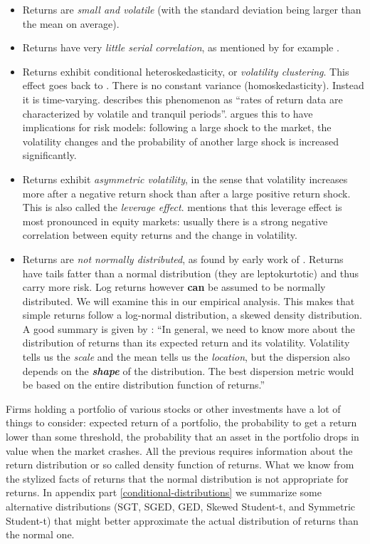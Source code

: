 \documentclass[a4paper, nobind]{templates/ociamthesis}
\providecommand{\tightlist}{%
  \setlength{\itemsep}{0pt}\setlength{\parskip}{0pt}}
\begin{document}
\begin{itemize}
\tightlist
\item
  Returns are \emph{small and volatile} (with the standard deviation being larger than the mean on average).
\item
  Returns have very \emph{little serial correlation}, as mentioned by for example \textcite{bollerslev1987}.
\item
  Returns exhibit conditional heteroskedasticity, or \emph{volatility clustering}. This effect goes back to \textcite{mandelbrot1963}. There is no constant variance (homoskedasticity). Instead it is time-varying. \textcite{bollerslev1987} describes this phenomenon as ``rates of return data are characterized by volatile and tranquil periods''. \textcite{alexander2008} argues this to have implications for risk models: following a large shock to the market, the volatility changes and the probability of another large shock is increased significantly.
\item
  Returns exhibit \emph{asymmetric volatility}, in the sense that volatility increases more after a negative return shock than after a large positive return shock. This is also called the \emph{leverage effect}. \textcite{alexander2008} mentions that this leverage effect is most pronounced in equity markets: usually there is a strong negative correlation between equity returns and the change in volatility.
\item
  Returns are \emph{not normally distributed}, as found by early work of \textcite{fama1965}. Returns have tails fatter than a normal distribution (they are leptokurtotic) and thus carry more risk. Log returns however \textbf{can} be assumed to be normally distributed. We will examine this in our empirical analysis. This makes that simple returns follow a log-normal distribution, a skewed density distribution. A good summary is given by \textcite{alexander2008} : ``In general, we need to know more about the distribution of returns than its expected return and its volatility. Volatility tells us the \emph{scale} and the mean tells us the \emph{location}, but the dispersion also depends on the \textbf{\emph{shape}} of the distribution. The best dispersion metric would be based on the entire distribution function of returns.''
\end{itemize}

\noindent Firms holding a portfolio of various stocks or other investments have a lot of things to consider: expected return of a portfolio, the probability to get a return lower than some threshold, the probability that an asset in the portfolio drops in value when the market crashes. All the previous requires information about the return distribution or so called density function of returns. What we know from the stylized facts of returns that the normal distribution is not appropriate for returns. In appendix part \ref{conditional-distributions} we summarize some alternative distributions (SGT, SGED, GED, Skewed Student-t, and Symmetric Student-t) that might better approximate the actual distribution of returns than the normal one.
\end{document}
